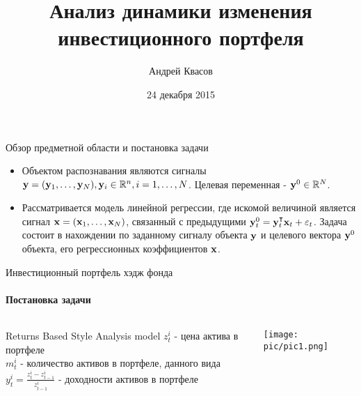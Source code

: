 \documentclass[1pt]{beamer}
\author{Андрей Квасов}
\title{Анализ динамики изменения инвестиционного портфеля}
\institute{МГУ им. М.\ В.\ Ломоносова}
\date{24 декабря 2015}
\let\T\intercal
\def\bo_#1{\bold{#1}}
\begin{document}
\begin{frame}
\titlepage
\end{frame}



\begin{frame}{Обзор предметной области и постановка задачи}
\begin{itemize}
\item Объектом распознавания являются сигналы $\bo_y = (\bo_y_1,\dots,\bo_y_N), \bo_y_i \in \mathbb{R}^n, i=1,\dots,N$. Целевая переменная - $\bo_y^0 \in \mathbb{R}^N$.
\item Рассматривается модель линейной регрессии, где искомой величиной является сигнал $\bo_x = (\bo_x_1,\dots,\bo_x_N)$, связанный с предыдущими  $\bo_y^0_t = \bo_y_t^\T\bo_x_t + \varepsilon_t$. Задача состоит в нахождении по заданному сигналу объекта $\bo_y$ и целевого вектора $\bo_y^0$ объекта, его регрессионных коэффициентов $\bo_x$.
\end{itemize}
\end{frame}

\begin{frame}{Инвестиционный портфель хэдж фонда}
\framesubtitle{Постановка задачи}
\begin{columns}[T]
    \begin{column}{.5\textwidth}
     \begin{block}{Returns Based Style Analysis model}
		$z_t^i$ - цена актива в портфеле\\
		$m_t^i$ - количество активов в портфеле, данного вида\\
		$y_t^i = \frac{z_t^i - z_{t-1}^i}{z_{t-1}^i}$ - доходности активов в портфеле\\
    \end{block}
    \end{column}
    \begin{column}{.5\textwidth}
   	 \texttt{[image: pic/pic1.png]}
    \end{column}
  \end{columns}
\end{frame}
	
\end{document}
